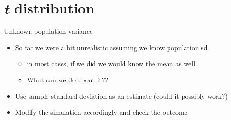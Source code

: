 \documentclass[
  ignorenonframetext,
]{beamer}
\providecommand{\tightlist}{%
  \setlength{\itemsep}{0pt}\setlength{\parskip}{0pt}}
\begin{document}
\section{\texorpdfstring{\emph{t}
distribution}{t distribution}}\label{t-distribution}

\begin{frame}{Unknown population variance}
\label{unknown-population-variance}
\begin{itemize}
\tightlist
\item
  So far we were a bit unrealistic assuming we know population sd

  \begin{itemize}
  \tightlist
  \item
    in most cases, if we did we would know the mean as well
  \item
    What can we do about it??
  \end{itemize}
\item
  Use sample standard deviation as an estimate (could it possibly work?)
\item
  Modify the simulation accordingly and check the outcome
\end{itemize}
\end{frame}
\end{document}
